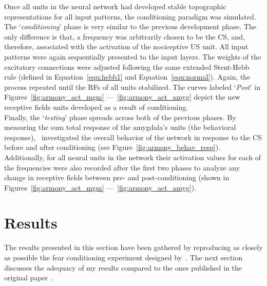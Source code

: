 Once all units in the neural network had developed stable topographic representations for all input patterns, the conditioning paradigm was simulated. The `\emph{conditioning}' phase is very similar to the previous development phase. The only difference is that, a frequency was arbitrarily chosen to be the CS, and, therefore, associated with the activation of the nociceptive US unit. All input patterns were again sequentially presented to the input layers. The weights of the excitatory connections were adjusted following the same extended Stent-Hebb rule (defined in Equation~\ref{equ:hebb1} and Equation~\ref{equ:normal}). Again, the process repeated until the RFs of all units stabilized. The curves labeled `\emph{Post}' in Figures~\ref{fig:armony_act_mgm} ---~\ref{fig:armony_act_amyg} depict the new receptive fields units developed as a result of conditioning.\\

Finally, the `\emph{testing}' phase spreads across both of the previous phases. By measuring the sum total response of the amygdala's units (the behavioral response),~\citet{Armony1995} investigated the overall behavior of the network in response to the CS before and after conditioning (see Figure~\ref{fig:armony_behav_resp}). Additionally, for all neural units in the network their activation values for each of the frequencies  were also recorded after the first two phases to analyze any change in receptive fields between pre- and post-conditioning (shown in Figures~\ref{fig:armony_act_mgm} ---~\ref{fig:armony_act_amyg}).

\section{Results}
The results presented in this section have been gathered by reproducing as closely as possible the fear conditioning experiment designed by~\citet{Armony1995}. The next section discusses the adequacy of my results compared to the ones published in the original paper~\supercite{Armony1995}.\\


